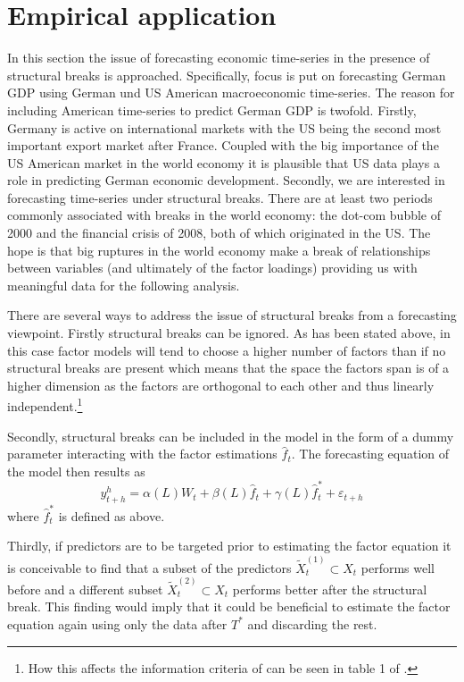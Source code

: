 \documentclass[12pt]{article}
\begin{document}
\section{Empirical application}
In this section the issue of forecasting economic time-series in the presence of structural breaks is approached. Specifically, focus is put on forecasting German GDP using German und US American macroeconomic time-series. The reason for including American time-series to predict German GDP is twofold. Firstly, Germany is active on international markets with the US being the second most important export market after France. Coupled with the big importance of the US American market in the world economy it is plausible that US data plays a role in predicting German economic development. Secondly, we are interested in forecasting time-series under structural breaks. There are at least two periods commonly associated with breaks in the world economy: the dot-com bubble of 2000 and the financial crisis of 2008, both of which originated in the US. The hope is that big ruptures in the world economy make a break of relationships between variables (and ultimately of the factor loadings) providing us with meaningful data for the following analysis.

There are several ways to address the issue of structural breaks from a forecasting viewpoint. Firstly structural breaks can be ignored. As has been stated above, in this case factor models will tend to choose a higher number of factors than if no structural breaks are present which means that the space the factors span is of a higher dimension as the factors are orthogonal to each other and thus linearly independent.\footnote{How this affects the information criteria of \citet{bai2002determining} can be seen in table 1 of \citet{breitung2011testing}.}

Secondly, structural breaks can be included in the model in the form of a dummy parameter interacting with the factor estimations $\hat f_t$. The forecasting equation of the model then results as
\begin{equation}
	\label{forecasting, structural breaks}
	y^h_{t+h} = \alpha(L) W_t + \beta(L) \hat f_t + \gamma(L) \hat f_t^* + \varepsilon_{t+h}
\end{equation}
where $\hat f_t^*$ is defined as above.

Thirdly, if predictors are to be targeted prior to estimating the factor equation it is conceivable to find that a subset of the predictors $\tilde X_t^{(1)} \subset X_t$ performs well before and a different subset $\tilde X_t^{(2)} \subset X_t$ performs better after the structural break. This finding would imply that it could be beneficial to estimate the factor equation again using only the data after $T^*$ and discarding the rest.
\end{document}
